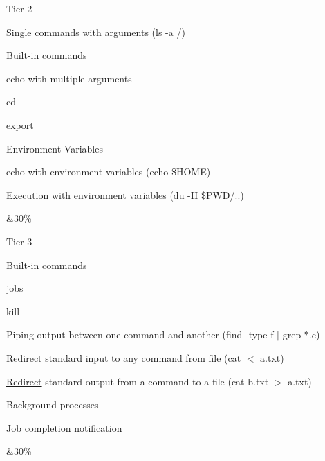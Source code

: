 \begin{longtabu}
\begin{DoxyItemize}
\item Tier 2  
\begin{DoxyItemize}
\item Single commands with arguments (ls -\/a /)  
\item Built-\/in commands  
\begin{DoxyItemize}
\item echo with multiple arguments  
\item cd  
\item export  
\end{DoxyItemize}
\item Environment Variables  
\begin{DoxyItemize}
\item echo with environment variables (echo \$\+H\+O\+ME)  
\item Execution with environment variables (du -\/H \$\+P\+WD/..) 
\end{DoxyItemize}
\end{DoxyItemize}
\end{DoxyItemize}&30\%   \\

\begin{DoxyItemize}
\item Tier 3  
\begin{DoxyItemize}
\item Built-\/in commands  
\begin{DoxyItemize}
\item jobs  
\item kill  
\end{DoxyItemize}
\item Piping output between one command and another (find -\/type f $|$ grep \textquotesingle{}$\ast$.c\textquotesingle{})  
\item \hyperlink{structRedirect}{Redirect} standard input to any command from file (cat $<$ a.\+txt)  
\item \hyperlink{structRedirect}{Redirect} standard output from a command to a file (cat b.\+txt $>$ a.\+txt)  
\item Background processes  
\begin{DoxyItemize}
\item Job completion notification  
\end{DoxyItemize}
\end{DoxyItemize}
\end{DoxyItemize}&30\%   \\


\end{longtabu}
